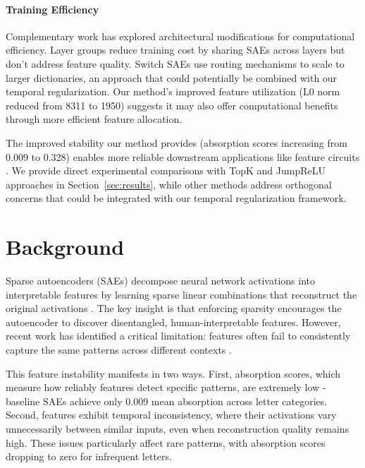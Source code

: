 \documentclass{article} %
\begin{document}
\paragraph{Training Efficiency} Complementary work has explored architectural modifications for computational efficiency. Layer groups \cite{ghilardiEfficientTrainingSparse2024a} reduce training cost by sharing SAEs across layers but don't address feature quality. Switch SAEs \cite{mudideEfficientDictionaryLearning2024a} use routing mechanisms to scale to larger dictionaries, an approach that could potentially be combined with our temporal regularization. Our method's improved feature utilization (L0 norm reduced from 8311 to 1950) suggests it may also offer computational benefits through more efficient feature allocation.

The improved stability our method provides (absorption scores increasing from 0.009 to 0.328) enables more reliable downstream applications like feature circuits \cite{marksSparseFeatureCircuits2024}. We provide direct experimental comparisons with TopK and JumpReLU approaches in Section~\ref{sec:results}, while other methods address orthogonal concerns that could be integrated with our temporal regularization framework.

\section{Background}
\label{sec:background}

Sparse autoencoders (SAEs) decompose neural network activations into interpretable features by learning sparse linear combinations that reconstruct the original activations \cite{Gao2024ScalingAE}. The key insight is that enforcing sparsity encourages the autoencoder to discover disentangled, human-interpretable features. However, recent work has identified a critical limitation: features often fail to consistently capture the same patterns across different contexts \cite{chaninAbsorptionStudyingFeature2024}.

This feature instability manifests in two ways. First, absorption scores, which measure how reliably features detect specific patterns, are extremely low - baseline SAEs achieve only 0.009 mean absorption across letter categories. Second, features exhibit temporal inconsistency, where their activations vary unnecessarily between similar inputs, even when reconstruction quality remains high. These issues particularly affect rare patterns, with absorption scores dropping to zero for infrequent letters.
\end{document}
